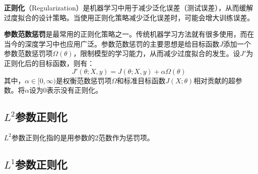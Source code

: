 
\textbf{正则化}（Regularization）是机器学习中用于减少泛化误差（测试误差），从而缓解过度拟合的设计策略。当使用正则化策略减少泛化误差时，可能会增大训练误差。

\textbf{参数范数惩罚}是最常用的正则化策略之一。传统机器学习方法就有很多使用，而在当今的深度学习中也应用广泛。参数范数惩罚的主要思想是给目标函数$J$添加一个参数范数惩罚项$\Omega(\theta)$，限制模型的学习能力，从而减少过度拟合的发生。设$J'$为正则化后的目标函数，则有：
\begin{equation}
J'(\theta;X,y)=J(\theta;X,y)+\alpha\Omega(\theta)
\end{equation}
其中，$\alpha\in[0,\infty)$是权衡范数惩罚项$\Omega$和标准目标函数$J(X;\theta)$相对贡献的超参数。将$\alpha$设为$0$表示没有正则化。

\subsection{$L^2$参数正则化}

$L^2$参数正则化指的是用参数的2范数作为惩罚项。


\subsection{$L^1$参数正则化}